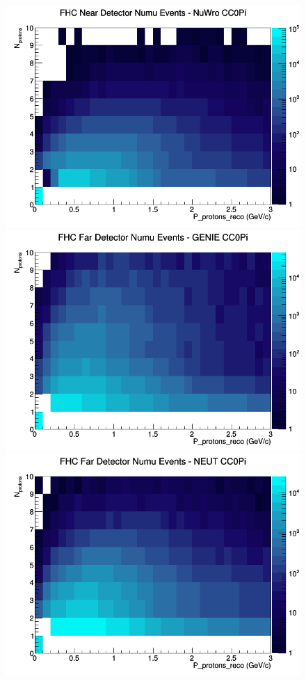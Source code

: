 \begin{figure}[h]
\includegraphics[width=\linewidth]{eff_N_P/FGT/protons/CC0Pi_FHC_ND_numu_N_P_NuWro.png}
\endminipage
\newline
{}
\includegraphics[width=\linewidth]{eff_N_P/FGT/protons/CC0Pi_FHC_FD_numu_N_P_GENIE.png}
\endminipage
{}
\includegraphics[width=\linewidth]{eff_N_P/FGT/protons/CC0Pi_FHC_FD_numu_N_P_NEUT.png}

\end{figure}
